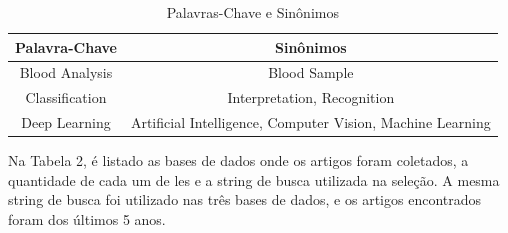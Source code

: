 \begin{table}[!htb]
	\centering
	\caption{Palavras-Chave e Sinônimos}
	\label{tbl:palavrasChave}
	\begin{tabular}{|c|c|}
		\hline
		\textbf{Palavra-Chave} & \textbf{Sinônimos}                                        \\ \hline
		Blood Analysis         & Blood Sample                                               \\ \hline
		Classification         & Interpretation, Recognition                                \\ \hline
		Deep Learning          & Artificial Intelligence, Computer Vision, Machine Learning \\ \hline
	\end{tabular}
	\vspace{6pt}
\end{table}

Na Tabela 2, é listado as bases de dados onde os artigos foram coletados, a quantidade de cada um de les e a string de busca utilizada na seleção. A mesma string de busca foi utilizado nas três bases de dados, e os artigos encontrados foram dos últimos 5 anos.

